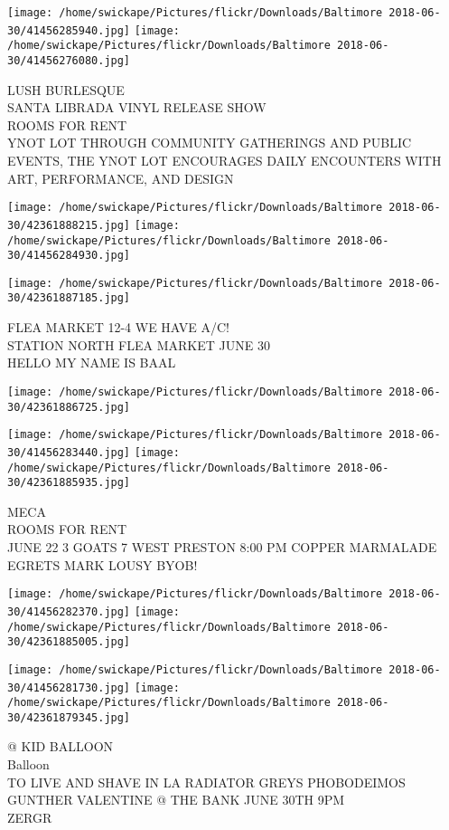 \documentclass[10pt,letterpaper]{article}
\begin{document}
\texttt{[image: /home/swickape/Pictures/flickr/Downloads/Baltimore 2018-06-30/41456285940.jpg]}
\texttt{[image: /home/swickape/Pictures/flickr/Downloads/Baltimore 2018-06-30/41456276080.jpg]}

LUSH BURLESQUE\\
SANTA LIBRADA VINYL RELEASE SHOW\\
ROOMS FOR RENT\\
YNOT LOT THROUGH COMMUNITY GATHERINGS AND PUBLIC EVENTS, THE YNOT LOT ENCOURAGES DAILY ENCOUNTERS WITH ART, PERFORMANCE, AND DESIGN
\pagebreak

\texttt{[image: /home/swickape/Pictures/flickr/Downloads/Baltimore 2018-06-30/42361888215.jpg]}
\texttt{[image: /home/swickape/Pictures/flickr/Downloads/Baltimore 2018-06-30/41456284930.jpg]}

\texttt{[image: /home/swickape/Pictures/flickr/Downloads/Baltimore 2018-06-30/42361887185.jpg]}

FLEA MARKET 12{-}4 WE HAVE A/C!\\
STATION NORTH FLEA MARKET JUNE 30\\
HELLO MY NAME IS BAAL
\pagebreak

\texttt{[image: /home/swickape/Pictures/flickr/Downloads/Baltimore 2018-06-30/42361886725.jpg]}

\vspace{0.25in}
\texttt{[image: /home/swickape/Pictures/flickr/Downloads/Baltimore 2018-06-30/41456283440.jpg]}
\texttt{[image: /home/swickape/Pictures/flickr/Downloads/Baltimore 2018-06-30/42361885935.jpg]}

MECA\\
ROOMS FOR RENT\\
JUNE 22 3 GOATS 7 WEST PRESTON 8:00 PM COPPER MARMALADE EGRETS MARK LOUSY BYOB!
\pagebreak

\texttt{[image: /home/swickape/Pictures/flickr/Downloads/Baltimore 2018-06-30/41456282370.jpg]}
\texttt{[image: /home/swickape/Pictures/flickr/Downloads/Baltimore 2018-06-30/42361885005.jpg]}

\texttt{[image: /home/swickape/Pictures/flickr/Downloads/Baltimore 2018-06-30/41456281730.jpg]}
\texttt{[image: /home/swickape/Pictures/flickr/Downloads/Baltimore 2018-06-30/42361879345.jpg]}

@ KID BALLOON\\
Balloon\\
TO LIVE AND SHAVE IN LA RADIATOR GREYS PHOBODEIMOS GUNTHER VALENTINE @ THE BANK JUNE 30TH 9PM\\
ZERGR
\pagebreak
\end{document}
